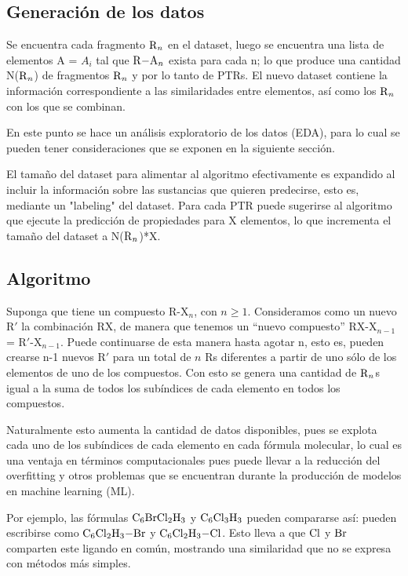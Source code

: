 \documentclass[twoside,twocolumn]{article}
\begin{document}
\subsection{Generaci\'on de los datos}

Se encuentra cada fragmento $\ce{R_n}$ en el dataset, luego se encuentra una lista de elementos A = {$A_i$} tal que $\ce{R-A_n}$ exista para cada n; lo que produce una cantidad N($\ce{R_n}$) de fragmentos $\ce{R_n}$ y por lo tanto de PTRs. El nuevo dataset contiene la informaci\'on correspondiente a las similaridades entre elementos, as\'i como los $\ce{R_n}$ con los que se combinan.

En este punto se hace un an\'alisis exploratorio de los datos (EDA), para lo cual se pueden tener consideraciones que se exponen en la siguiente secci\'on.

El tama\~no del dataset para alimentar al algoritmo efectivamente es expandido al incluir la informaci\'on sobre las sustancias que quieren predecirse, esto es, mediante un "labeling" del dataset. 
Para cada PTR puede sugerirse al algoritmo que ejecute la predicci\'on de propiedades para X elementos, lo que incrementa el tama\~no del dataset a N($\ce{R_n}$)*X.

\subsection{Algoritmo}
Suponga que tiene un compuesto R-X$_n$, con $n \geq 1$. Consideramos como un nuevo R$'$ la combinaci\'on RX, de manera que tenemos un ``nuevo compuesto'' RX-X$_{n-1}$ = R$'$-X$_{n-1}$. Puede continuarse de esta manera hasta agotar n, esto es, pueden crearse n-1 nuevos R$'$ para un total de $n$ Rs diferentes a partir de uno s\'olo de los elementos de uno de los compuestos. Con esto se genera una cantidad de $\ce{R_n}$s igual a la suma de todos los sub\'indices de cada elemento en todos los compuestos.

Naturalmente esto aumenta la cantidad de datos disponibles, pues se explota cada uno de los sub\'indices de cada elemento en cada f\'ormula molecular, lo cual es una ventaja en t\'erminos computacionales pues puede llevar a la reducci\'on del overfitting y otros problemas que se encuentran durante la producci\'on de modelos en machine learning (ML).

Por ejemplo, las f\'ormulas $\ce{C6BrCl2H3}$ y $\ce{C6Cl3H3}$ pueden compararse as\'i: pueden escribirse como $\ce{C6Cl2H3-Br}$ y $\ce{C6Cl2H3-Cl}$. Esto lleva a que $\ce{Cl}$ y $\ce{Br}$ comparten este ligando en com\'un, mostrando una similaridad que no se expresa con m\'etodos m\'as simples.
\end{document}
